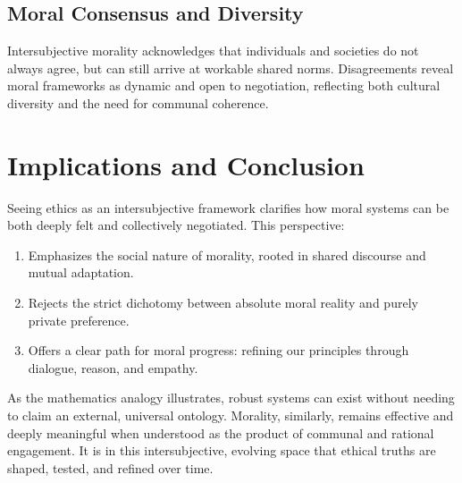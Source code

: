 \documentclass{article}
\begin{document}
\subsection{Moral Consensus and Diversity}

Intersubjective morality acknowledges that individuals and societies do not always agree, but can still arrive at workable shared norms. Disagreements reveal moral frameworks as dynamic and open to negotiation, reflecting both cultural diversity and the need for communal coherence.

\section{Implications and Conclusion}

Seeing ethics as an intersubjective framework clarifies how moral systems can be both deeply felt and collectively negotiated. This perspective:

\begin{enumerate}
  \item Emphasizes the social nature of morality, rooted in shared discourse and mutual adaptation.
  \item Rejects the strict dichotomy between absolute moral reality and purely private preference.
  \item Offers a clear path for moral progress: refining our principles through dialogue, reason, and empathy.
\end{enumerate}

As the mathematics analogy illustrates, robust systems can exist without needing to claim an external, universal ontology. Morality, similarly, remains effective and deeply meaningful when understood as the product of communal and rational engagement. It is in this intersubjective, evolving space that ethical truths are shaped, tested, and refined over time.
\end{document}
